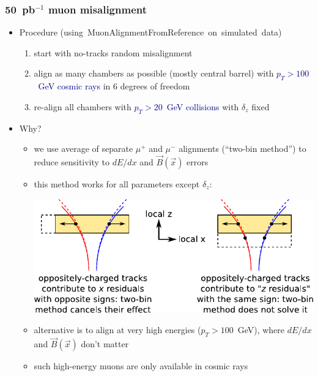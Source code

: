 \documentclass[compress]{beamer}
\begin{document}
\begin{frame}
\frametitle{50~pb$^{-1}$ muon misalignment}

\begin{itemize}
\item Procedure \mbox{(using MuonAlignmentFromReference on simulated data)\hspace{-1 cm}}
\begin{enumerate}
\item start with no-tracks random misalignment
\item align as many chambers as possible (mostly central barrel) with \textcolor{darkblue}{$p_T > 100$~GeV cosmic rays} in 6 degrees of freedom
\item re-align all chambers with \textcolor{darkblue}{$p_T > 20$~GeV collisions} with $\delta_z$ fixed
\end{enumerate}

\item Why?
\begin{itemize}
\item we use average of separate $\mu^+$ and $\mu^-$ alignments
  (``two-bin method'') to reduce sensitivity to $dE/dx$ and
  $\vec{B}(\vec{x})$ errors
\item this method works for all parameters except $\delta_z$:
\begin{center} \includegraphics[width=0.7\linewidth]{explanation_of_z.pdf} \end{center}

\item alternative is to align at very high energies ($p_T > 100$~GeV), where $dE/dx$ and
  $\vec{B}(\vec{x})$ don't matter

\item such high-energy muons are only available in cosmic rays
\end{itemize}
\end{itemize}
\end{frame}
\end{document}
